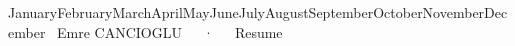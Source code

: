 \documentclass[11pt, a4paper]{awesome-cv}
\newcommand{\enmonthyear}{%
  \ifcase\month\or January\or February\or March\or April\or May\or June\or July\or August\or September\or October\or November\or December\fi\ \number\year
}
\begin{document}
\makecvheader[L]
\vspace{-10mm}

\makecvfooter
  {\enmonthyear}
  {Emre CANCIOGLU~~~·~~~Resume}
  {\thepage}









\end{document}
